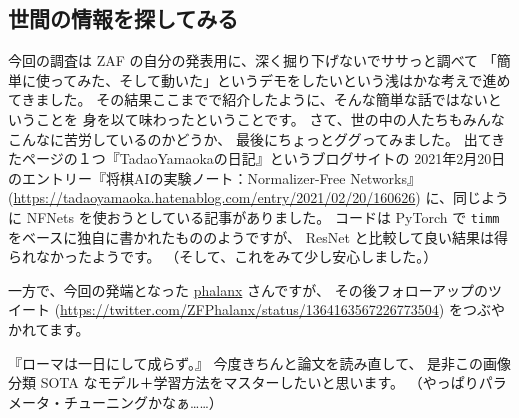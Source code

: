 \documentclass[dvipdfmx,autodetect-engine,10pt,b5paper,papersize,openany,dvipsnames]{jsbook}
\begin{document}
\begin{multicols}{2}
\section{世間の情報を探してみる}
今回の調査は ZAF の自分の発表用に、深く掘り下げないでササっと調べて
「簡単に使ってみた、そして動いた」というデモをしたいという浅はかな考えで進めてきました。
その結果ここまでで紹介したように、そんな簡単な話ではないということを
身を以て味わったということです。
さて、世の中の人たちもみんなこんなに苦労しているのかどうか、
最後にちょっとググってみました。
出てきたページの１つ『TadaoYamaokaの日記』というブログサイトの
2021年2月20日のエントリー『将棋AIの実験ノート：Normalizer-Free Networks』
(\url{https://tadaoyamaoka.hatenablog.com/entry/2021/02/20/160626})
に、同じように NFNets を使おうとしている記事がありました。
コードは PyTorch で \texttt{timm} をベースに独自に書かれたもののようですが、
ResNet と比較して良い結果は得られなかったようです。
（そして、これをみて少し安心しました。）

一方で、今回の発端となった
\href{https://twitter.com/ZFPhalanx}{phalanx} さんですが、
その後フォローアップのツイート
(\url{https://twitter.com/ZFPhalanx/status/1364163567226773504})
をつぶやかれてます。

『ローマは一日にして成らず。』
今度きちんと論文を読み直して、
是非この画像分類 SOTA なモデル＋学習方法をマスターしたいと思います。
（やっぱりパラメータ・チューニングかなぁ……）


\end{multicols}

\vspace{2cm}
\end{document}
